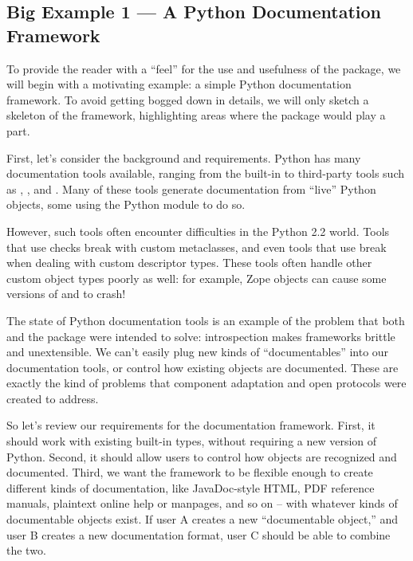 \subsection{Big Example 1 --- A Python Documentation Framework\label{protocols-example1}}

To provide the reader with a ``feel'' for the use and usefulness of the
 package, we will begin with a motivating example: a simple
Python documentation framework.  To avoid getting bogged down in details, we
will only sketch a skeleton of the framework, highlighting areas where the
 package would play a part.

First, let's consider the background and requirements.  Python has many
documentation tools available, ranging from the built-in  to
third-party tools such as , , and
.  Many of these tools generate documentation from ``live''
Python objects, some using the Python  module to do so.

However, such tools often encounter difficulties in the Python 2.2 world.
Tools that use  checks break with custom metaclasses, and even
tools that use  break when dealing with custom
descriptor types.  These tools often handle other custom object types poorly as
well: for example, Zope  objects can cause some versions of
 and  to crash!

The state of Python documentation tools is an example of the problem that both
 and the  package were intended to solve:
introspection makes frameworks brittle and unextensible.  We can't easily plug
new kinds of ``documentables'' into our documentation tools, or control how
existing objects are documented.  These are exactly the kind of problems that
component adaptation and open protocols were created to address.

So let's review our requirements for the documentation framework.  First, it
should work with existing built-in types, without requiring a new version of
Python.  Second, it should allow users to control how objects are recognized
and documented.  Third, we want the framework to be flexible enough to create
different kinds of documentation, like JavaDoc-style HTML, PDF reference
manuals, plaintext online help or manpages, and so on -- with whatever kinds of
documentable objects exist.  If user A creates a new ``documentable object,''
and user B creates a new documentation format, user C should be able to combine
the two.




